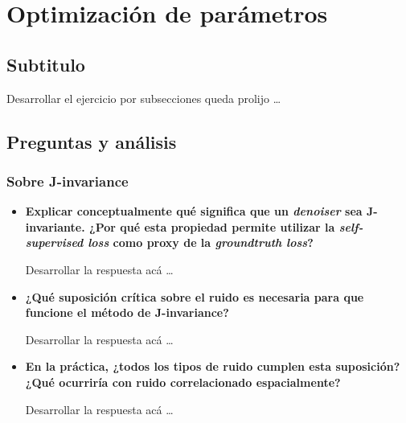 \section{Optimización de parámetros}

    \subsection{Subtitulo}

        Desarrollar el ejercicio por subsecciones queda prolijo \dots

    \subsection{Preguntas y análisis}

        \subsubsection*{Sobre J-invariance}
        \begin{itemize}[leftmargin=*]
            \item \textbf{Explicar conceptualmente qué significa que un \textit{denoiser} sea J-invariante. ¿Por qué esta propiedad permite utilizar la \textit{self-supervised loss} como proxy de la \textit{groundtruth loss}?} 
            
                Desarrollar la respuesta acá \dots
            
            \item \textbf{¿Qué suposición crítica sobre el ruido es necesaria para que funcione el método de J-invariance?} 
            
                Desarrollar la respuesta acá \dots
            
            \item \textbf{En la práctica, ¿todos los tipos de ruido cumplen esta suposición? ¿Qué ocurriría con ruido correlacionado espacialmente?}
            
                Desarrollar la respuesta acá \dots

        \end{itemize}
        
